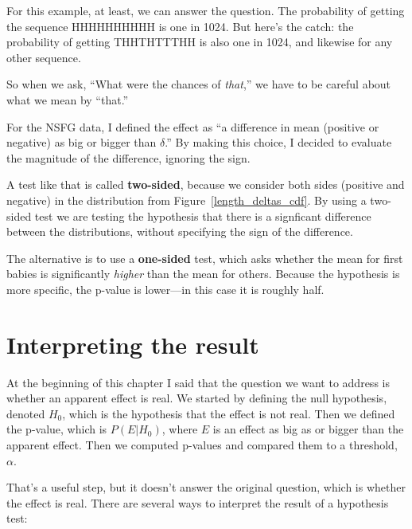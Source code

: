 \documentclass[12pt]{book}
\begin{document}
For this example, at least, we can answer the question.  The
probability of getting the sequence HHHHHHHHHH is one in 1024.  But
here's the catch: the probability of getting THHTHTTTHH is also one in
1024, and likewise for any other sequence.

So when we ask, ``What were the chances of {\em that},'' we have
to be careful about what we mean by ``that.''

For the NSFG data, I defined the effect as ``a difference in mean
(positive or negative) as big or bigger than $\delta$.''  By making
this choice, I decided to evaluate the magnitude of the difference,
ignoring the sign.

A test like that is called {\bf two-sided}, because we consider both
sides (positive and negative) in the distribution from
Figure~\ref{length_deltas_cdf}.  By using a two-sided test we are
testing the hypothesis that there is a signficant difference between
the distributions, without specifying the sign of the difference.

The alternative is to use a {\bf one-sided} test, which asks whether
the mean for first babies is significantly {\em higher} than
the mean for others.  Because the hypothesis is more specific, the
p-value is lower---in this case it is roughly half.


\section{Interpreting the result}

At the beginning of this chapter I said that the question we want to
address is whether an apparent effect is real.  We started by defining
the null hypothesis, denoted $H_0$, which is the
hypothesis that the effect is not real.  Then we defined the p-value,
which is $P(E | H_0)$, where $E$ is an effect as big as or bigger than
the apparent effect.  Then we computed p-values and compared
them to a threshold, $\alpha$.

That's a useful step, but it doesn't answer the original question,
which is whether the effect is real.  There are several ways to
interpret the result of a hypothesis test:
\end{document}
